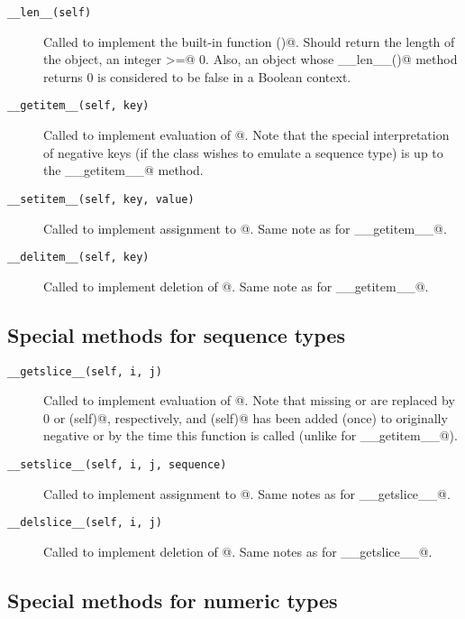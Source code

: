 \begin{description}

\item[{\tt __len__(self)}]
Called to implement the built-in function \verb@len()@.  Should return
the length of the object, an integer \verb@>=@ 0.  Also, an object
whose \verb@__len__()@ method returns 0 is considered to be false in a
Boolean context.

\item[{\tt __getitem__(self, key)}]
Called to implement evaluation of \verb@self[key]@.  Note that the
special interpretation of negative keys (if the class wishes to
emulate a sequence type) is up to the \verb@__getitem__@ method.

\item[{\tt __setitem__(self, key, value)}]
Called to implement assignment to \verb@self[key]@.  Same note as for
\verb@__getitem__@.

\item[{\tt __delitem__(self, key)}]
Called to implement deletion of \verb@self[key]@.  Same note as for
\verb@__getitem__@.

\end{description}


\subsection{Special methods for sequence types}

\begin{description}

\item[{\tt __getslice__(self, i, j)}]
Called to implement evaluation of \verb@self[i:j]@.  Note that missing
\verb@i@ or \verb@j@ are replaced by 0 or \verb@len(self)@,
respectively, and \verb@len(self)@ has been added (once) to originally
negative \verb@i@ or \verb@j@ by the time this function is called
(unlike for \verb@__getitem__@).

\item[{\tt __setslice__(self, i, j, sequence)}]
Called to implement assignment to \verb@self[i:j]@.  Same notes as for
\verb@__getslice__@.

\item[{\tt __delslice__(self, i, j)}]
Called to implement deletion of \verb@self[i:j]@.  Same notes as for
\verb@__getslice__@.

\end{description}


\subsection{Special methods for numeric types}

